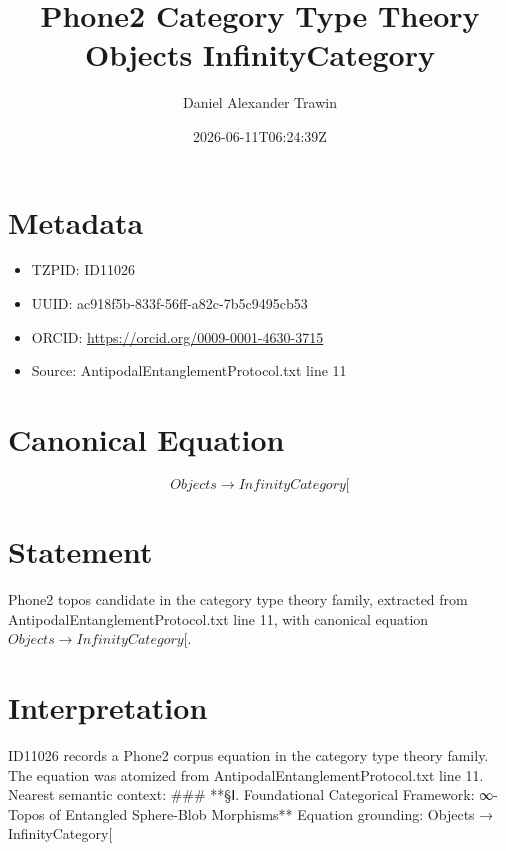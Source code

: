 \documentclass[11pt]{article}
\title{Phone2 Category Type Theory Objects InfinityCategory}
\author{Daniel Alexander Trawin}
\date{2026-06-11T06:24:39Z}
\begin{document}
\maketitle
\section*{Metadata}
\begin{itemize}
\item TZPID: ID11026
\item UUID: ac918f5b-833f-56ff-a82c-7b5c9495cb53
\item ORCID: \url{https://orcid.org/0009-0001-4630-3715}
\item Source: AntipodalEntanglementProtocol.txt line 11
\end{itemize}
\section*{Canonical Equation}
\[
Objects → InfinityCategory[
\]
\section*{Statement}
Phone2 topos candidate in the category type theory family, extracted from AntipodalEntanglementProtocol.txt line 11, with canonical equation $Objects → InfinityCategory[$.
\section*{Interpretation}
ID11026 records a Phone2 corpus equation in the category type theory family. The equation was atomized from AntipodalEntanglementProtocol.txt line 11. Nearest semantic context: ### **§Ⅰ. Foundational Categorical Framework: ∞-Topos of Entangled Sphere-Blob Morphisms** Equation grounding: Objects → InfinityCategory[
\end{document}
